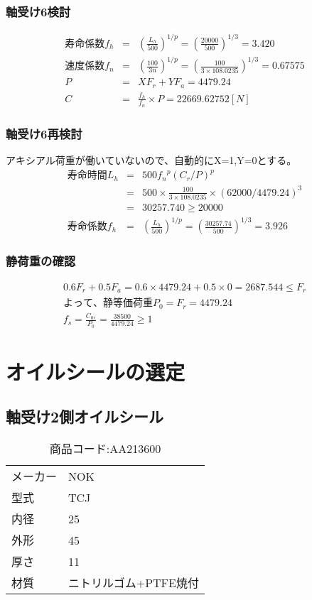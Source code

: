 \subsubsection{軸受け6検討}
\begin{eqnarray}
寿命係数f_h &=& \left( \frac{L_h}{500} \right)^{1/p} = \left( \frac{20000}{500} \right)^{1/3} = 3.420\\
速度係数f_n &=& \left( \frac{100}{3n} \right)^{1/p} = \left( \frac{100}{3 \times 108.0235} \right)^{1/3} = 0.67575\\
P &=& XF_r+YF_a = 4479.24\\
C &=& \frac{f_h}{f_n} \times P = 22669.62752[N]
\end{eqnarray}

\subsubsection{軸受け6再検討}
アキシアル荷重が働いていないので、自動的にX=1,Y=0とする。
\begin{eqnarray}
寿命時間L_h &=& 500{f_n}^p(C_r/P)^p\\
           &=& 500 \times \frac{100}{3 \times 108.0235} \times (62000/4479.24)^3\\
           &=& 30257.740 \geq 20000\\
寿命係数f_h &=& \left( \frac{L_h}{500} \right)^{1/p} = \left( \frac{30257.74}{500} \right)^{1/3} = 3.926
\end{eqnarray}

\subsubsection{静荷重の確認}
\begin{eqnarray}
0.6F_r+0.5F_a=0.6 \times 4479.24 + 0.5 \times 0 = 2687.544 \leq F_r\\
よって、静等価荷重P_0 = F_r = 4479.24\\
f_s = \frac{C_{0r}}{P_0} = \frac{38500}{4479.24} \geq 1
\end{eqnarray}

\section{オイルシールの選定}
\subsection{軸受け2側オイルシール}
\begin{table}[htb]
\begin{center}
  \caption{商品コード:AA213600}
  \begin{tabular}{ll}
    \hline
    メーカー&NOK\\
    型式&TCJ\\
    内径&25\\
    外形&45\\
    厚さ&11\\
    材質&ニトリルゴム+PTFE焼付\\
    \hline
  \end{tabular}
\end{center}
\end{table}

